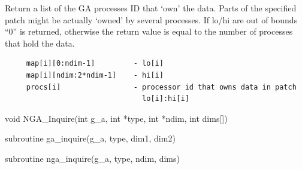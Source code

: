 \documentclass[10pt]{article}
\begin{document}
\local

\begin{desc}

Return a list of the GA processes ID that `own' the data. Parts of the
specified patch might be actually `owned' by several processes. If lo/hi are
out of bounds ``0'' is returned, otherwise the return value is equal to the
number of processes that hold the data.

\begin{verbatim}
     map[i][0:ndim-1]         - lo[i]
     map[i][ndim:2*ndim-1]    - hi[i]
     procs[i]                 - processor id that owns data in patch
                                lo[i]:hi[i]
\end{verbatim}

\end{desc}



\begin{capi}
\begin{ccode}
void NGA_Inquire(int g_a, int *type, int *ndim, int dims[])
\end{ccode}
\begin{funcargs}
\end{funcargs}
\end{capi}

\begin{f2dapi}
\begin{fcode}
subroutine ga_inquire(g_a, type, dim1, dim2)
\end{fcode}
\begin{funcargs}
\end{funcargs}
\end{f2dapi}

\begin{fapi}
\begin{fcode}
subroutine nga_inquire(g_a, type, ndim, dims)
\end{fcode}
\begin{funcargs}
\end{funcargs}
\end{fapi}
\end{document}
